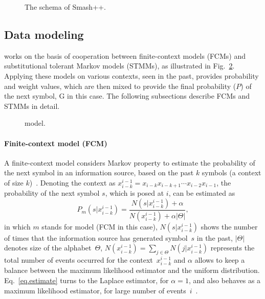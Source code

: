 \begin{figure}[!h]
\caption{The schema of Smash++.}
\label{fig.schema}
\end{figure}

\subsection{Data modeling}
\smashpp works on the basis of cooperation between finite-context models (FCMs) and substitutional tolerant Markov models (STMMs), as illustrated in Fig.~\ref{fig.model}. Applying these models on various contexts, seen in the past, provides probability and weight values, which are then mixed to provide the final probability ($P$) of the next symbol, G in this case. The following subsections describe FCMs and STMMs in detail.

\begin{figure}[!h]
\caption{model.}
\label{fig.model}
\end{figure}

\paragraph{Finite-context model (FCM)}
A finite-context model considers Markov property to estimate the probability of the next symbol in an information source, based on the past $k$ symbols (a context of size $k$)~\cite{sayood2017introduction,hosseini2019ac,pinho2013mfcompress}. Denoting the context as $x_{i-k}^{i-1} = x_{i-k} x_{i-k+1}\cdots x_{i-2} x_{i-1}$, the probability of the next symbol $s$, which is posed at $i$, can be estimated as
\begin{equation} \label{eq.estimate}
P_m(s|x_{i-k}^{i-1}) = \frac{N(s|x_{i-k}^{i-1})+\alpha}{N(x_{i-k}^{i-1})+ \alpha|\Theta|},
\end{equation}
in which $m$ stands for model (FCM in this case), $N(s|x_{i-k}^{i-1})$ shows the number of times that the information source has generated symbol~$s$ in the past, $|\Theta|$ denotes size of the alphabet~$\Theta$, $N(x_{i-k}^{i-1}) = \sum_{j \in \Theta} N(j|x_{i-k}^{i-1})$ represents the total number of events occurred for the context~$x_{i-k}^{i-1}$ and $\alpha$ allows to keep a balance between the maximum likelihood estimator and the uniform distribution. Eq.~\ref{eq.estimate} turns to the Laplace estimator, for $\alpha=1$, and also behaves as a maximum likelihood estimator, for large number of events~$i$~\cite{pratas2015alignment}.

